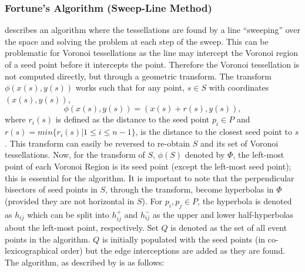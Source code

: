 \subsubsection{Fortune's Algorithm (Sweep-Line Method)}\label{tes:ssec:fort}
\citet{fortune1987sweepline} describes an algorithm where the tessellations are found by a line ``sweeping'' over the space and solving the problem at each step of the sweep. This can be problematic for Voronoi tessellations as the line may intercept the Voronoi region of a seed point before it intercepts the point. Therefore the Voronoi tessellation is not computed directly, but through a geometric transform. The transform $\phi(x(s),y(s))$ works such that for any point, $s \in S$ with coordinates $(x(s),y(s))$, 
\begin{equation}
  \phi(x(s),y(s)) = (x(s) + r(s), y(s)),
\end{equation}
where $r_i(s)$ is defined as the distance to the seed point $p_i \in P$ and $r(s) = min\{r_i(s) | 1 \leq i \leq n-1\}$, is the distance to the closest seed point to $s$. This transform can easily be reversed to re-obtain $S$ and its set of Voronoi tessellations. Now, for the transform of $S$, $\phi(S)$ denoted by $\Phi$, the left-most point of each Voronoi Region is its seed point (except the left-most seed point); this is essential for the algorithm. It is important to note that the perpendicular bisectors of seed points in $S$, through the transform, become hyperbolas in $\Phi$ (provided they are not horizontal in $S$). For $p_i,p_j\in P$, the hyperbola is denoted as $h_{ij}$ which can be split into $h^+_{ij}$ and $h^-_{ij}$ as the upper and lower half-hyperbolas about the left-most point, respectively. Set $Q$ is denoted as the set of all event points in the algorithm. $Q$ is initially populated with the seed points (in co-lexicographical order) but the edge interceptions are added as they are found. The algorithm, as described by \citet{okabe2009spatial} is as follows:
